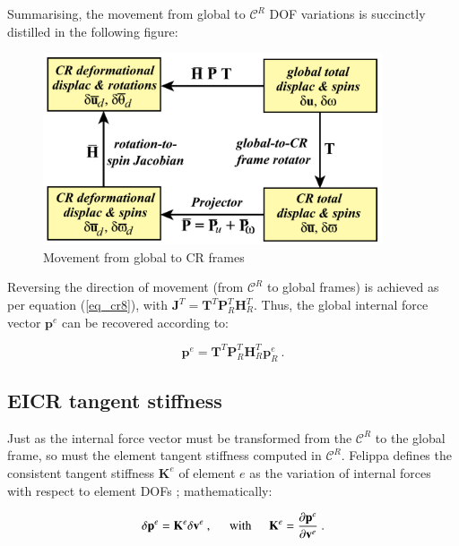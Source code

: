 Summarising, the movement from global to $\mathscr{C}^R$ DOF variations is succinctly distilled in the following figure:

\begin{figure}[H]
	\centering
	\def\svgwidth{\columnwidth}
	\includegraphics[width=10cm]{images/cr_6.png}
	\caption{Movement from global to CR frames \cite{felippa2005unified}}
	\label{cr6}
\end{figure}

Reversing the direction of movement (from $\mathscr{C}^R$ to global frames) is achieved as per equation (\ref{eq_cr8}), with $\mathbf{J}^T = \mathbf{T}^T \mathbf{P}_R^T \mathbf{H}_R^T$. Thus, the global internal force vector $\mathbf{p}^e$ can be recovered according to:

\begin{equation} 
\mathbf{p}^e
=
\mathbf{T}^T \mathbf{P}_R^T \mathbf{H}_R^T
\mathbf{p}_R^e
\label{eq_cr10}\ .
\end{equation}
 
 \subsection{EICR tangent stiffness}
 Just as the internal force vector must be transformed from the $\mathscr{C}^R$ to the global frame, so must the element tangent stiffness computed in $\mathscr{C}^R$. Felippa defines the consistent tangent stiffness $\mathbf{K}^e$ of element $e$ as the variation of internal forces with respect to element DOFs \cite{felippa2005unified}; mathematically:
 
 \begin{equation} 
\delta \mathbf{p}^e
 =
\mathbf{K}^e \delta \mathbf{v}^e\ ,
\hspace{5mm}
\text{with}
\hspace{5mm}
\mathbf{K}^e = 
\frac{\partial \mathbf{p}^e}{\partial \mathbf{v}^e}
 \label{eq_cr11}\ .
 \end{equation}
 
